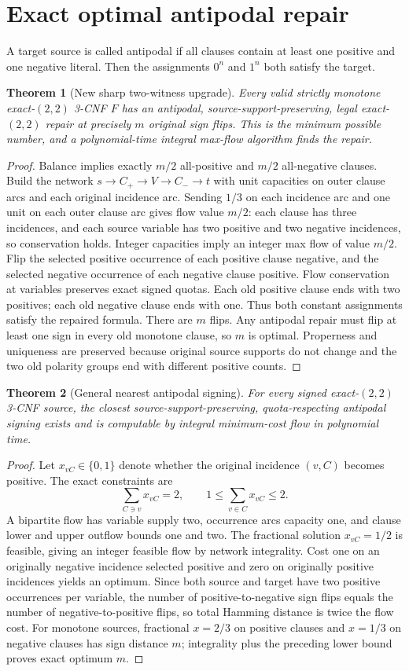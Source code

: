\documentclass[11pt]{article}
\newtheorem{theorem}{Theorem}
\begin{document}
\section{Exact optimal antipodal repair}
A target source is called antipodal if all clauses contain at least one positive and one negative literal. Then the assignments $0^n$ and $1^n$ both satisfy the target.
\begin{theorem}[New sharp two-witness upgrade]
Every valid strictly monotone exact-$(2,2)$ 3-CNF $F$ has an antipodal, source-support-preserving, legal exact-$(2,2)$ repair at precisely $m$ original sign flips. This is the minimum possible number, and a polynomial-time integral max-flow algorithm finds the repair.
\end{theorem}
\begin{proof}
Balance implies exactly $m/2$ all-positive and $m/2$ all-negative clauses. Build the network $s\to C_+\to V\to C_-\to t$ with unit capacities on outer clause arcs and each original incidence arc. Sending $1/3$ on each incidence arc and one unit on each outer clause arc gives flow value $m/2$: each clause has three incidences, and each source variable has two positive and two negative incidences, so conservation holds. Integer capacities imply an integer max flow of value $m/2$. Flip the selected positive occurrence of each positive clause negative, and the selected negative occurrence of each negative clause positive. Flow conservation at variables preserves exact signed quotas. Each old positive clause ends with two positives; each old negative clause ends with one. Thus both constant assignments satisfy the repaired formula. There are $m$ flips. Any antipodal repair must flip at least one sign in every old monotone clause, so $m$ is optimal. Properness and uniqueness are preserved because original source supports do not change and the two old polarity groups end with different positive counts.
\end{proof}
\begin{theorem}[General nearest antipodal signing]
For every signed exact-$(2,2)$ 3-CNF source, the closest source-support-preserving, quota-respecting antipodal signing exists and is computable by integral minimum-cost flow in polynomial time.
\end{theorem}
\begin{proof}
Let $x_{vC}\in\{0,1\}$ denote whether the original incidence $(v,C)$ becomes positive. The exact constraints are
\[
\sum_{C\ni v}x_{vC}=2,\qquad 1\le\sum_{v\in C}x_{vC}\le2.
\]
A bipartite flow has variable supply two, occurrence arcs capacity one, and clause lower and upper outflow bounds one and two. The fractional solution $x_{vC}=1/2$ is feasible, giving an integer feasible flow by network integrality. Cost one on an originally negative incidence selected positive and zero on originally positive incidences yields an optimum. Since both source and target have two positive occurrences per variable, the number of positive-to-negative sign flips equals the number of negative-to-positive flips, so total Hamming distance is twice the flow cost. For monotone sources, fractional $x=2/3$ on positive clauses and $x=1/3$ on negative clauses has sign distance $m$; integrality plus the preceding lower bound proves exact optimum $m$.
\end{proof}
\end{document}
